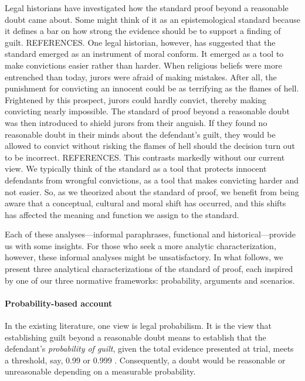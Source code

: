 \documentclass[10pt]{article}
\begin{document}
Legal historians have investigated how the standard proof beyond a reasonable doubt came about. Some might think of it as 
an epistemological standard because it defines a bar on how strong the evidence should be to support a finding 
of guilt. REFERENCES. One legal historian, however, has suggested that the standard emerged as an instrument of moral conform. 
It emerged as a tool to make convictions easier rather than harder. When religious beliefs were more entrenched than today, 
jurors were afraid of making mistakes. After all, the punishment for convicting an innocent could be as terrifying as 
the flames of hell. Frightened by this prospect, jurors could hardly convict, thereby making convicting nearly impossible. 
The standard of proof beyond a reasonable doubt was then introduced to shield jurors from their anguish. 
If they found no reasonable doubt  in their minds about the defendant's guilt, they would be allowed to convict without risking the flames 
of hell should the decision turn out to be incorrect. REFERENCES. This contrasts markedly without our current view. We typically think of the standard as a tool 
that protects innocent defendants from wrongful convictions, as a tool that makes convicting harder and not easier. So, as we theorized about the standard of proof, we benefit from being aware that a conceptual, cultural and moral shift has occurred, and this shifts has affected the meaning and function we assign to the standard. 

Each of these analyses---informal paraphrases, functional and historical---provide us with 
some insights. For those who seek a more analytic characterization, however, 
these informal analyses might be unsatisfactory. In what follows, we present three analytical characterizations of the standard of proof, 
each inspired by one of our three normative frameworks: 
probability, arguments and scenarios. 






\paragraph{Probability-based account}

In the existing literature, one view is legal probabilism. It is the view that establishing guilt beyond a reasonable doubt means to establish that the defendant's \textit{probability of guilt}, given the total evidence presented at trial, meets a threshold, say, 0.99 or 0.999  \citep{Kaplan1968Decision, Kaye1999Clarifying-the-, Tillers2007}. Consequently, a doubt would be reasonable or unreasonable depending on a measurable probability.  
\end{document}
